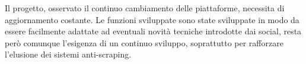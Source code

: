 Il progetto, osservato il continuo cambiamento delle piattaforme, necessita di aggiornamento costante. Le funzioni sviluppate sono state sviluppate in modo da essere facilmente adattate ad eventuali novit\`a tecniche introdotte dai social, resta per\`o comunque l'esigenza di un continuo sviluppo, soprattutto per rafforzare l'elusione dei sistemi anti-scraping.

